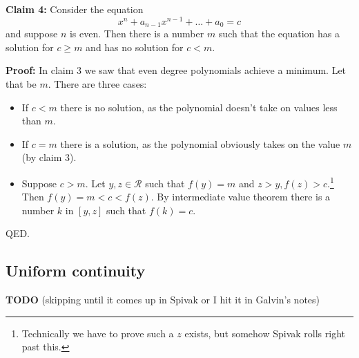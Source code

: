 \vs

\textbf{Claim 4:} Consider the equation
\[x^{n}+a_{n-1}x^{n-1}+\ldots+a_{0}=c\]
and suppose $n$ is even. Then there is a number $m$ such that the
equation has a solution for $c\geq m$ and has no solution for $c<m$.

\vs

\textbf{Proof:} In claim 3 we saw that even degree polynomials achieve
a minimum. Let that be $m$. There are three cases:
\begin{itemize}
\item If $c<m$ there is no solution, as the polynomial doesn't take on
  values less than $m$.
\item If $c=m$ there is a solution, as the polynomial obviously takes
  on the value $m$ (by claim 3).
\item Suppose $c>m$. Let $y,z\in\mathcal{R}$ such that $f(y)=m$ and
  $z>y, f(z)>c$.\footnote{Technically we have to prove such a $z$
    exists, but somehow Spivak rolls right past this.} Then
  $f(y)=m<c<f(z)$. By intermediate value theorem there is a number $k$
  in $[y,z]$ such that $f(k)=c$.
\end{itemize}

QED.

\subsection{Uniform continuity}
\textbf{TODO} (skipping until it comes up in Spivak or I hit it in
Galvin's notes)

